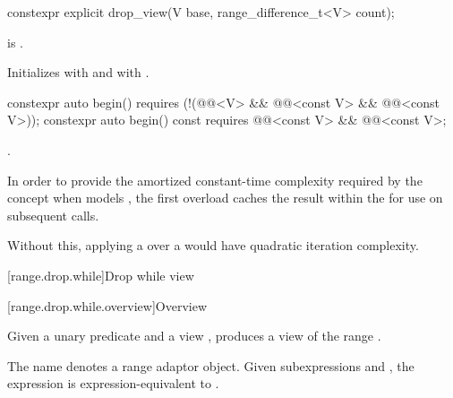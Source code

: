 %
\begin{itemdecl}
constexpr explicit drop_view(V base, range_difference_t<V> count);
\end{itemdecl}

\begin{itemdescr}
\pnum
\expects
{} is .

\pnum
\effects
Initializes  with  and
 with .
\end{itemdescr}

%
\begin{itemdecl}
constexpr auto begin()
  requires (!(@@<V> &&
              @@<const V> && @@<const V>));
constexpr auto begin() const
  requires @@<const V> && @@<const V>;
\end{itemdecl}

\begin{itemdescr}
\pnum
\returns
{}.

\pnum
\remarks
In order to provide the amortized constant-time complexity required
by the  concept
when  models ,
the first overload caches the result within the 
for use on subsequent calls.
\begin{note}
Without this,
applying a  over a 
would have quadratic iteration complexity.
\end{note}
\end{itemdescr}

[range.drop.while]{Drop while view}

[range.drop.while.overview]{Overview}

\pnum
Given a unary predicate  and a view ,
 produces a view
of the range .

\pnum
{}%
The name 
denotes a range adaptor object.
Given subexpressions  and ,
the expression 
is expression-equivalent to .

